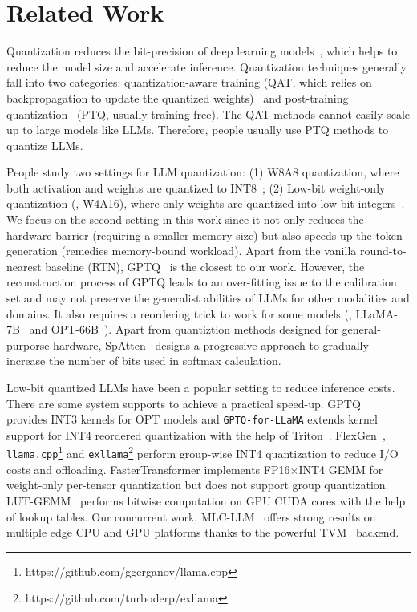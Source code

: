 \section{Related Work}
Quantization reduces the bit-precision of deep learning models~\cite{han2016deep, jacob2018quantization, nagel2019data, wang2019haq, nagel2020up,lin2020mcunet}, which helps to reduce the model size and accelerate inference. Quantization techniques generally fall into two categories: quantization-aware training (QAT, which relies on backpropagation to update the quantized weights)~\cite{bengio2013estimating, gholami2021survey, nagel2021white, choi2018pact} and post-training quantization~\cite{jacob2018quantization, nagel2019data, nagel2020up} (PTQ, usually training-free). The QAT methods cannot easily scale up to large models like LLMs. Therefore, people usually use PTQ methods to quantize LLMs. 

 People study two settings for LLM quantization: (1) W8A8 quantization, where both activation and weights are quantized to INT8~\cite{dettmers2022llmint8, xiao2022smoothquant, zeroquant, outlier_suppression, wei2023outlier}; (2) Low-bit weight-only quantization (\eg, W4A16), where only weights are quantized into low-bit integers~\cite{frantar2022gptq, dettmers2022case, sheng2023high, park2022nuqmm}. We focus on the second setting in this work since it not only reduces the hardware barrier (requiring a smaller memory size) but also speeds up the token generation (remedies memory-bound workload). Apart from the vanilla round-to-nearest baseline (RTN), GPTQ~\cite{frantar2022gptq} is the closest to our work. However, the reconstruction process of GPTQ leads to an over-fitting issue to the calibration set and may not preserve the generalist abilities of LLMs for other modalities and domains. It also requires a reordering trick to work for some models (\eg, LLaMA-7B~\cite{touvron2023llama} and OPT-66B~\cite{opt}). Apart from quantiztion methods designed for general-purporse hardware, SpAtten~\cite{spatten} designs a progressive approach to gradually increase the number of bits used in softmax calculation.

 Low-bit quantized LLMs have been a popular setting to reduce inference costs. There are some system supports to achieve a practical speed-up. GPTQ~\cite{frantar2022gptq} provides INT3 kernels for OPT models and \texttt{GPTQ-for-LLaMA} extends kernel support for INT4 reordered quantization with the help of Triton~\cite{tillet2019triton}. FlexGen~\cite{sheng2023high}, \texttt{llama.cpp}\footnote{https://github.com/ggerganov/llama.cpp} and \texttt{exllama}\footnote{https://github.com/turboderp/exllama} perform group-wise INT4 quantization to reduce I/O costs and offloading. FasterTransformer implements FP16$\times$INT4 GEMM for weight-only per-tensor quantization but does not support group quantization. LUT-GEMM~\cite{park2022nuqmm} performs bitwise computation on GPU CUDA cores with the help of lookup tables. Our concurrent work, MLC-LLM~\cite{mlc-llm} offers strong results on multiple edge CPU and GPU platforms thanks to the powerful TVM~\cite{chen2018tvm,feng2022tensorir} backend. %

